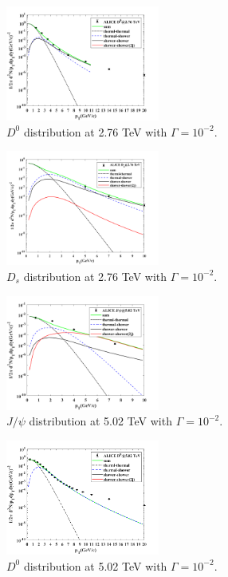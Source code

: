 \documentclass[twocolumn,aps,superscriptaddress,nofootinbib,floatfix]{revtex4}
\begin{document}
\begin{figure}[H]
	\includegraphics[width=0.45\textwidth]{D0276_230213.png}
	\caption{$D^0$ distribution at 2.76 TeV with $\Gamma=10^{-2}$. }
	\label{fig47}
\end{figure}
\begin{figure}[H]
	\includegraphics[width=0.45\textwidth]{Ds276_230205.png}
	\caption{$D_s$ distribution at 2.76 TeV with $\Gamma=10^{-2}$. }
	\label{fig48}
\end{figure}
\begin{figure}[H]
	\includegraphics[width=0.45\textwidth]{Jpsi502_230213.png}
	\caption{$J/\psi$ distribution at 5.02 TeV with $\Gamma=10^{-2}$. }
	\label{fig49}
\end{figure}
\begin{figure}[H]
	\includegraphics[width=0.45\textwidth]{D0502_230213.png}
	\caption{$D^0$ distribution at 5.02 TeV with $\Gamma=10^{-2}$. }
	\label{fig50}
\end{figure}
\end{document}
